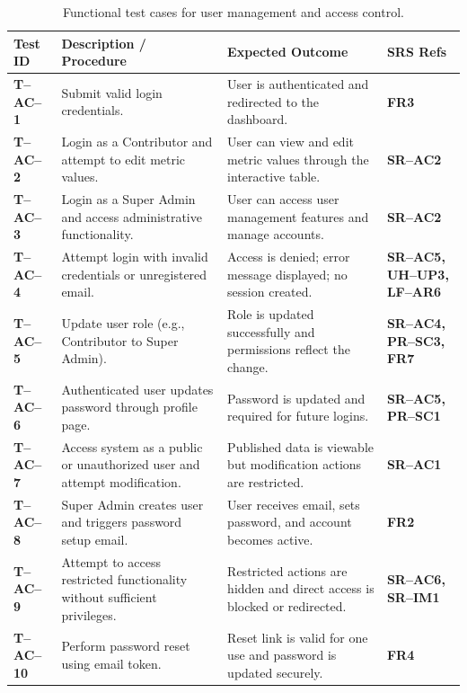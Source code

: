 \documentclass[12pt, titlepage]{article}
\begin{document}
\begin{table}[H]
\centering
\begin{tabularx}{\textwidth}{|l|X|X|X|}
\hline
\textbf{Test ID} & \textbf{Description / Procedure} & \textbf{Expected Outcome} & \textbf{SRS Refs} \\
\hline


\textbf{T--AC--1} &
Submit valid login credentials. &
User is authenticated and redirected to the dashboard. &
\textbf{FR3} \\
\hline

\textbf{T--AC--2} &
Login as a Contributor and attempt to edit metric values. &
User can view and edit metric values through the interactive table. &
\textbf{SR--AC2} \\
\hline

\textbf{T--AC--3} &
Login as a Super Admin and access administrative functionality. &
User can access user management features and manage accounts. &
\textbf{SR--AC2} \\
\hline

\textbf{T--AC--4} &
Attempt login with invalid credentials or unregistered email. &
Access is denied; error message displayed; no session created. &
\textbf{SR--AC5, UH--UP3, LF--AR6} \\
\hline

\textbf{T--AC--5} &
Update user role (e.g., Contributor to Super Admin). &
Role is updated successfully and permissions reflect the change. &
\textbf{SR--AC4, PR--SC3, FR7} \\
\hline

\textbf{T--AC--6} &
Authenticated user updates password through profile page. &
Password is updated and required for future logins. &
\textbf{SR--AC5, PR--SC1} \\
\hline

\textbf{T--AC--7} &
Access system as a public or unauthorized user and attempt modification. &
Published data is viewable but modification actions are restricted. &
\textbf{SR--AC1} \\
\hline

\textbf{T--AC--8} &
Super Admin creates user and triggers password setup email. &
User receives email, sets password, and account becomes active. &
\textbf{FR2} \\
\hline

\textbf{T--AC--9} &
Attempt to access restricted functionality without sufficient privileges. &
Restricted actions are hidden and direct access is blocked or redirected. &
\textbf{SR--AC6, SR--IM1} \\
\hline

\textbf{T--AC--10} &
Perform password reset using email token. &
Reset link is valid for one use and password is updated securely. &
\textbf{FR4} \\
\hline

\end{tabularx}
\caption{Functional test cases for user management and access control.}
\end{table}
\end{document}
